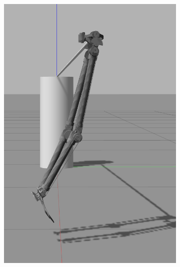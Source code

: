 \begin{figure}[ht!]
\begin{subfigure}[b]{0.16\textwidth}
        \includegraphics[width=\textwidth]{figures/gazebo_jumping_5}
    \end{subfigure}
    \begin{subfigure}[b]{0.16\textwidth}

\end{subfigure}
\end{figure}
